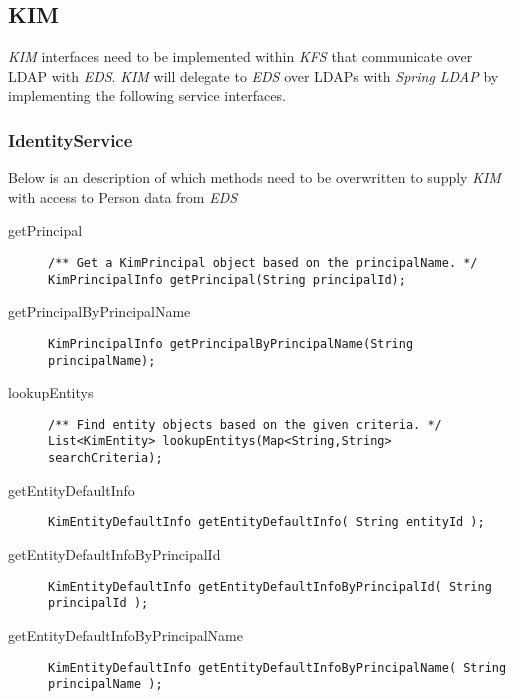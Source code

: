 \documentclass[12pt,notitlepage]{article}
\begin{document}
\subsection{KIM}
\emph{KIM} interfaces need to be implemented within \emph{KFS} that communicate over LDAP with \emph{EDS}. \emph{KIM}
will delegate to \emph{EDS} over LDAPs with \emph{Spring LDAP} by implementing the following service interfaces.

\subsubsection{IdentityService}
Below is an description of which methods need to be overwritten to supply \emph{KIM} with access to Person data from \emph{EDS}
\begin{description}
  \item [getPrincipal]
\begin{lstlisting}
/** Get a KimPrincipal object based on the principalName. */
KimPrincipalInfo getPrincipal(String principalId);
\end{lstlisting}

\item[getPrincipalByPrincipalName]
\begin{lstlisting}
KimPrincipalInfo getPrincipalByPrincipalName(String principalName);
\end{lstlisting}

\item[lookupEntitys]
\begin{lstlisting}
/** Find entity objects based on the given criteria. */
List<KimEntity> lookupEntitys(Map<String,String> searchCriteria);
\end{lstlisting}

\item[getEntityDefaultInfo]
\begin{lstlisting}
KimEntityDefaultInfo getEntityDefaultInfo( String entityId );
\end{lstlisting}

\item[getEntityDefaultInfoByPrincipalId]
\begin{lstlisting}
KimEntityDefaultInfo getEntityDefaultInfoByPrincipalId( String principalId );
\end{lstlisting}

\item[getEntityDefaultInfoByPrincipalName]
\begin{lstlisting}
KimEntityDefaultInfo getEntityDefaultInfoByPrincipalName( String principalName );
\end{lstlisting}


\end{description}
\end{document}
